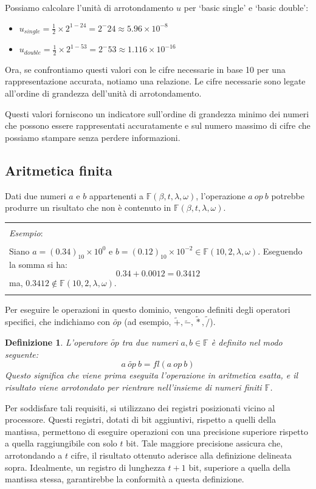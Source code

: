 \documentclass{article}
\newtheorem*{definition}{\color{red}\textbf{Definizione}}
\newenvironment{example}
{\begin{center}
        \begin{tabular}{|p{0.9\textwidth}|}
            \hline \\ 
            \textit{Esempio}: \\\\ 
        }
        {
            \\\\ \hline
        \end{tabular}
    \end{center}
}
\begin{document}
Possiamo calcolare l'unità di arrotondamento $u$ per `basic single' e `basic
double':
\begin{itemize}
    \item $u_{single}= \frac{1}{2} \times 2^{1-24}=2^-24\approx 5.96 \times
        10 ^{-8}$ 
    \item $u_{double}= \frac{1}{2} \times 2^{1-53}=2^-53\approx 1.116 \times
        10 ^{-16}$ 
\end{itemize}
Ora, se confrontiamo questi valori con le cifre necessarie in base 10 per
una rappresentazione accurata, notiamo una relazione. Le cifre necessarie
sono legate all'ordine di grandezza dell'unità di arrotondamento.

Questi valori forniscono un indicatore sull'ordine di grandezza minimo dei 
numeri che possono essere rappresentati accuratamente e sul numero massimo di 
cifre che possiamo stampare senza perdere informazioni.
\subsection{Aritmetica finita}
Dati due numeri $a$ e $b$ appartenenti a $\mathbb{F}(\beta,t,\lambda,\omega)$,
l'operazione $a\ op\ b$ potrebbe produrre un risultato che non è contenuto in
$\mathbb{F}(\beta,t,\lambda,\omega)$.
\begin{example}
    Siano $a=(0.34)_{10}\times10^{0}$ e $b=(0.12)_{10}\times10^{-2}\in
    \mathbb{F}(10,2,\lambda,\omega)$. Eseguendo la somma si ha: 
    $$0.34+0.0012=0.3412$$
    ma, $0.3412\notin \mathbb{F}(10,2,\lambda,\omega)$.
\end{example}
Per eseguire le operazioni in questo dominio, vengono definiti degli
operatori specifici, che indichiamo con $\tilde{op}$ (ad esempio, $\tilde{+},
\tilde{-}, \tilde{*}, \tilde{/}$).
\begin{definition}
    L'operatore $\tilde{op}$ tra due numeri $a,b\in \mathbb{F}$ è definito nel modo seguente:
    $$a\ \tilde{op}\ b=fl(a\ op\ b)$$
    Questo significa che viene prima eseguita l'operazione in aritmetica
    esatta, e il risultato viene arrotondato per rientrare nell'insieme di
    numeri finiti $\mathbb{F}$.
\end{definition}
Per soddisfare tali requisiti, si utilizzano dei registri posizionati vicino 
al processore. Questi registri, dotati di bit aggiuntivi, 
rispetto a quelli della mantissa, permettono di eseguire operazioni con una
precisione superiore rispetto a quella raggiungibile con solo $t$ bit. Tale
maggiore precisione assicura che, arrotondando a $t$ cifre, il risultato ottenuto
aderisce alla definizione delineata sopra. Idealmente, un registro di lunghezza
$t+1$ bit, superiore a quella della mantissa stessa, garantirebbe la
conformità a questa definizione.
\vskip 0.1in
\end{document}

